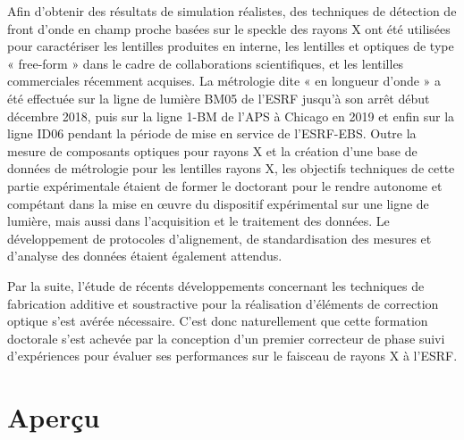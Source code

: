 Afin d'obtenir des résultats de simulation réalistes, des techniques de détection de front d'onde en champ proche basées sur le speckle des rayons X ont été utilisées pour caractériser les lentilles produites en interne, les lentilles et optiques de type « free-form » dans le cadre de collaborations scientifiques, et les lentilles commerciales récemment acquises. La métrologie dite « en longueur d'onde » a été effectuée sur la ligne de lumière BM05 de l'ESRF jusqu’à son arrêt début décembre 2018, puis sur la ligne 1-BM de l'APS à Chicago en 2019 et enfin sur la ligne ID06 pendant la période de mise en service de l'ESRF-EBS. Outre la mesure de composants optiques pour rayons X et la création d'une base de données de métrologie pour les lentilles rayons X, les objectifs techniques de cette partie expérimentale étaient de former le doctorant pour le rendre autonome et compétant dans la mise en œuvre du dispositif expérimental sur une ligne de lumière, mais aussi dans l’acquisition et le traitement des données. Le développement de protocoles d’alignement, de standardisation des mesures et d’analyse des données étaient également attendus. 

Par la suite, l’étude de récents développements concernant les techniques de fabrication additive et soustractive pour la réalisation d’éléments de correction optique s’est avérée nécessaire. C’est donc naturellement que cette formation doctorale s’est achevée par la conception d’un premier correcteur de phase suivi d’expériences pour évaluer ses performances sur le faisceau de rayons X à l'ESRF.


\section*{Aperçu}

